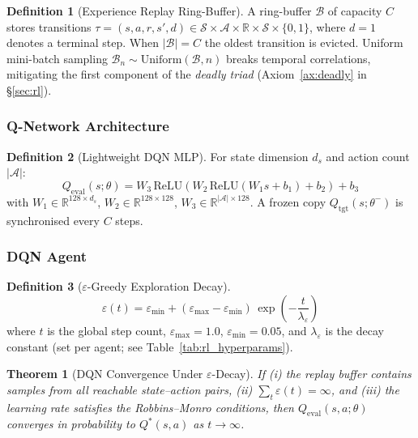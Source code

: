 \documentclass[12pt,a4paper]{article}
\theoremstyle{definition}
\newtheorem{definition}{Definition}[section]
\theoremstyle{plain}
\newtheorem{theorem}{Theorem}[section]
\theoremstyle{remark}
\newcommand{\R}{\mathbb{R}}
\begin{document}
\begin{definition}[Experience Replay Ring-Buffer]
A ring-buffer $\mathcal{B}$ of capacity $C$ stores transitions
$\tau = (s, a, r, s', d) \in \mathcal{S}\times\mathcal{A}\times\R
\times\mathcal{S}\times\{0,1\}$, where $d=1$ denotes a terminal step.
When $|\mathcal{B}| = C$ the oldest transition is evicted.
Uniform mini-batch sampling $\mathcal{B}_n \sim \text{Uniform}(\mathcal{B},n)$
breaks temporal correlations, mitigating the first component of the
\emph{deadly triad} (Axiom~\ref{ax:deadly} in \S\ref{sec:rl}).
\end{definition}

\subsubsection{Q-Network Architecture}

\begin{definition}[Lightweight DQN MLP]
\label{def:dqn_mlp}
For state dimension $d_s$ and action count $|\mathcal{A}|$:
\[
  Q_{\text{eval}}(s;\theta) =
  W_3\,\mathrm{ReLU}(W_2\,\mathrm{ReLU}(W_1 s + b_1) + b_2) + b_3
\]
with $W_1\!\in\!\R^{128\times d_s}$, $W_2\!\in\!\R^{128\times128}$,
$W_3\!\in\!\R^{|\mathcal{A}|\times128}$.
A frozen copy $Q_{\text{tgt}}(s;\theta^-)$ is synchronised every $C$ steps.
\end{definition}

\subsubsection{DQN Agent}

\begin{definition}[$\varepsilon$-Greedy Exploration Decay]
\[
  \varepsilon(t) = \varepsilon_{\min} +
  (\varepsilon_{\max} - \varepsilon_{\min})\,
  \exp\!\left(-\frac{t}{\lambda_\varepsilon}\right)
\]
where $t$ is the global step count, $\varepsilon_{\max}=1.0$,
$\varepsilon_{\min}=0.05$, and $\lambda_\varepsilon$ is the decay constant
(set per agent; see Table~\ref{tab:rl_hyperparams}).
\end{definition}

\begin{theorem}[DQN Convergence Under $\varepsilon$-Decay]
\label{thm:dqn_conv}
If (i) the replay buffer contains samples from all reachable state--action
pairs, (ii) $\sum_t \varepsilon(t) = \infty$, and (iii) the learning rate
satisfies the Robbins--Monro conditions, then $Q_{\text{eval}}(s,a;\theta)$
converges in probability to $Q^*(s,a)$ as $t\to\infty$.
\end{theorem}
\end{document}
